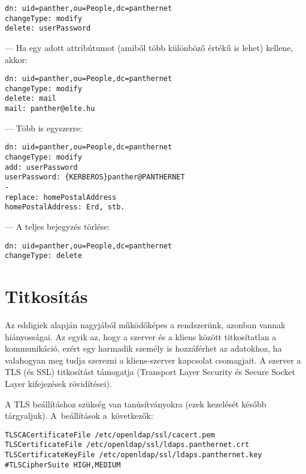 \begin{Verbatim}[frame=single]
dn: uid=panther,ou=People,dc=panthernet
changeType: modify
delete: userPassword
\end{Verbatim}


\noindent --- Ha egy adott attribútumot (amiből több különböző értékű is lehet) kellene, akkor:

\begin{Verbatim}[frame=single]
dn: uid=panther,ou=People,dc=panthernet
changeType: modify
delete: mail
mail: panther@elte.hu
\end{Verbatim}

\noindent --- Több is egyszerre:

\begin{Verbatim}[frame=single]
dn: uid=panther,ou=People,dc=panthernet
changeType: modify
add: userPassword
userPassword: {KERBEROS}panther@PANTHERNET
-
replace: homePostalAddress
homePostalAddress: Erd, stb.
\end{Verbatim}

\noindent --- A teljes bejegyzés törlése:
  
\begin{Verbatim}[frame=single]
dn: uid=panther,ou=People,dc=panthernet
changeType: delete
\end{Verbatim}



\section{Titkosítás}

Az eddigiek alapján nagyjából működőképes a rendszerünk, azonban vannak
hiányosságai. Az egyik az, hogy a szerver és a kliens között titkosítatlan a kommunikáció, ezért egy harmadik személy
is hozzáférhet az adatokhoz, ha valahogyan meg tudja szerezni a kliens-szerver kapcsolat csomagjait. A szerver a TLS
(és SSL) titkosítást támogatja (Transport Layer Security és Secure Socket Layer kifejezések rövidítései).

A TLS beállításhoz szükség van tanúsítványokra (ezek kezelését később tárgyaljuk). A~beállítások a~következők:

\begin{Verbatim}[frame=single]
TLSCACertificateFile /etc/openldap/ssl/cacert.pem
TLSCertificateFile /etc/openldap/ssl/ldaps.panthernet.crt
TLSCertificateKeyFile /etc/openldap/ssl/ldaps.panthernet.key
#TLSCipherSuite HIGH,MEDIUM
\end{Verbatim}  

